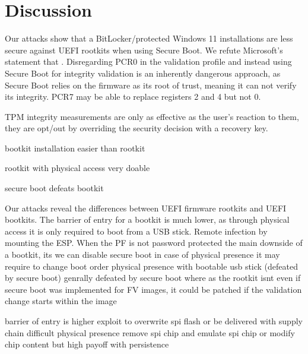 


\chapter{Discussion}

Our attacks show that a BitLocker\-/protected Windows 11 installations are less secure against \ac{UEFI} rootkits when using Secure Boot.
We refute Microsoft's statement that .
Disregarding \ac{PCR}0 in the validation profile and instead using Secure Boot for integrity validation is an inherently dangerous approach, as Secure Boot relies on the firmware as its root of trust, meaning it can not verify its integrity.
\ac{PCR}7 may be able to replace registers 2 and 4 but not 0.


\ac{TPM} integrity measurements are only as effective as the user's reaction to them, they are opt\-/out by overriding the security decision with a recovery key.


bootkit installation easier than rootkit

rootkit with physical access very doable

secure boot defeats bootkit


Our attacks reveal the differences between \ac{UEFI} firmware rootkits and \ac{UEFI} bootkits.
The barrier of entry for a bootkit is much lower, as through physical access it is only required to boot from a \ac{USB} stick.
Remote infection by mounting the \ac{ESP}.
When the \ac{PF} is not password protected the main downside of a bootkit, its  we can disable secure boot
in case of physical presence it may require to change boot order
physical presence with bootable usb stick (defeated by secure boot)
genrally defeated by secure boot where as the rootkit isnt
even if secure boot was implemented for FV images, it could be patched if the validation change starts within the image

barrier of entry is higher
exploit to overwrite spi flash or be delivered with supply chain difficult
physical presence remove spi chip and emulate spi chip or modify chip content
but high payoff with persistence

